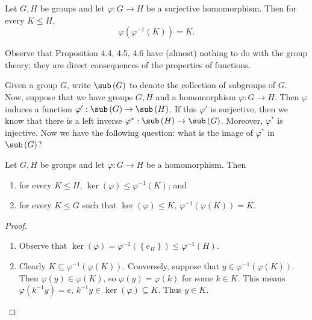 \documentclass[pmath347]{subfiles}
\begin{document}
    \begin{prop}{}
        Let $G,H$ be groups and let $\varphi:G\to H$ be a surjective homomorphism. Then for every $K\leq H$,
        \begin{equation*}
            \varphi\left( \varphi^{-1} \left( K \right)  \right) = K.
        \end{equation*}
    \end{prop}

    \np Observe that Proposition 4.4, 4.5, 4.6 have (almost) nothing to do with the group theory; they are direct consequences of the properties of functions.

    \np Given a group $G$, write $\sub\left( G \right)$ to denote the collection of subgroups of $G$. Now, suppose that we have groups $G,H$ and a homomorphism $\varphi:G\to H$. Then $\varphi$ induces a function $\varphi':\sub\left( G \right) \to \sub\left( H \right)$. If this $\varphi'$ is surjective, then we know that there is a left inverse $\varphi^{*} :\sub\left( H \right) \to\sub\left( G \right)$. Moreover, $\varphi^{*} $ is injective. Now we have the following question: what is the image of $\varphi^{*} $ in $\sub\left( G \right)$?

    \begin{prop}{}
        Let $G,H$ be groups and let $\varphi:G\to H$ be a homomorphism. Then
        \begin{enumerate}
            \item for every $K\leq H$, $\ker\left( \varphi \right) \leq \varphi^{-1} \left( K \right)$; and
            \item for every $K\leq G$ such that $\ker\left( \varphi \right) \leq K$, $\varphi^{-1} \left( \varphi\left( K \right)  \right) = K$.
        \end{enumerate}
    \end{prop}

    \begin{proof}
        \begin{enumerate}
            \item Observe that $\ker\left( \varphi \right) = \varphi^{-1} \left( \left\lbrace e_H \right\rbrace  \right) \leq \varphi^{-1} \left( H \right)$. \qqqedsym
            \item Clearly $K\subseteq\varphi^{-1} \left( \varphi\left( K \right) \right)$. Conversely, suppose that $y\in\varphi^{-1} \left( \varphi\left( K \right)  \right)$. Then $\varphi\left( y \right) \in \varphi\left( K \right)$, so $\varphi\left( y \right) = \varphi\left( k \right)$ for some $k\in K$. This means $\varphi\left( k^{-1} y \right) = e$, $k^{-1} y\in \ker\left( \varphi \right) \subseteq K$. Thus $y\in K$. \qqedsym
        \end{enumerate}
    \end{proof}
\end{document}
